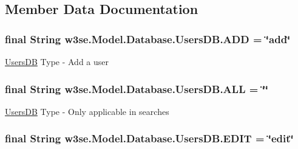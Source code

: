 \subsection{Member Data Documentation}
\hypertarget{classw3se_1_1_model_1_1_database_1_1_users_d_b_a7c8259ae8480306564b2e99b3537a60e}{
\subsubsection[{A\-D\-D}]{\setlength{\rightskip}{0pt plus 5cm}final String w3se.\-Model.\-Database.\-Users\-D\-B.\-A\-D\-D = \char`\"{}add\char`\"{}\hspace{0.3cm}{\ttfamily [static]}}}\label{classw3se_1_1_model_1_1_database_1_1_users_d_b_a7c8259ae8480306564b2e99b3537a60e}
\hyperlink{classw3se_1_1_model_1_1_database_1_1_users_d_b}{Users\-D\-B} Type -\/ Add a user \hypertarget{classw3se_1_1_model_1_1_database_1_1_users_d_b_a2a6247b7bd2e68351c43dde3cee7c7c9}{
\subsubsection[{A\-L\-L}]{\setlength{\rightskip}{0pt plus 5cm}final String w3se.\-Model.\-Database.\-Users\-D\-B.\-A\-L\-L = \char`\"{}\char`\"{}\hspace{0.3cm}{\ttfamily [static]}}}\label{classw3se_1_1_model_1_1_database_1_1_users_d_b_a2a6247b7bd2e68351c43dde3cee7c7c9}
\hyperlink{classw3se_1_1_model_1_1_database_1_1_users_d_b}{Users\-D\-B} Type -\/ Only applicable in searches \hypertarget{classw3se_1_1_model_1_1_database_1_1_users_d_b_a177ab6605d0dc4a0fea2c7c9dc6e98f7}{
\subsubsection[{E\-D\-I\-T}]{\setlength{\rightskip}{0pt plus 5cm}final String w3se.\-Model.\-Database.\-Users\-D\-B.\-E\-D\-I\-T = \char`\"{}edit\char`\"{}\hspace{0.3cm}{\ttfamily [static]}}}\label{classw3se_1_1_model_1_1_database_1_1_users_d_b_a177ab6605d0dc4a0fea2c7c9dc6e98f7}
